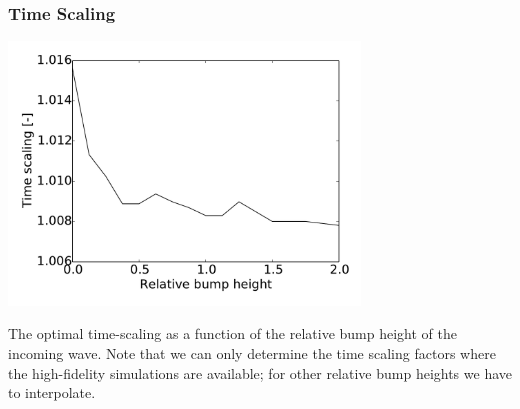 \documentclass[11pt,ucs]{beamer}
\begin{document}
\begin{frame}\frametitle{Time Scaling}

\begin{center}
\includegraphics[width=0.7\textwidth]{illustrate1d_time_scaling}
\end{center}


\small{
The optimal time-scaling as a function of the relative bump height of the incoming wave. Note that we can only determine the time scaling factors where the high-fidelity simulations are available; for other relative bump heights we have to interpolate. }



\end{frame}
\end{document}
